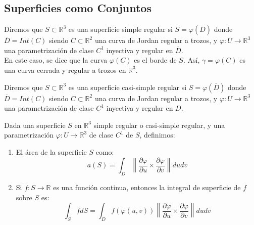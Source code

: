 \subsection{Superficies como Conjuntos}

\begin{definición} 
Diremos que $S \subset \mathbb{R}^3$ es una superficie simple regular si $S = \varphi (\overline{D})$ donde $\overline{D} = Int(C)$ siendo $C \subset \mathbb{R}^2$ una curva de Jordan regular a trozos, y $\varphi: U \to \mathbb{R}^3$ una parametrización de clase $C^1$ inyectiva y regular en $\overline{D}$.\\
En este caso, se dice que la curva $\varphi(C)$ es el borde de $S$. Así, $\gamma = \varphi(C)$ es una curva cerrada y regular a trozos en $\mathbb{R}^3$.
\end{definición}

\begin{definición} 
Diremos que $S \subset \mathbb{R}^3$ es una superficie casi-simple regular si $S = \varphi (\overline{D})$ donde $\overline{D} = Int(C)$ siendo $C \subset \mathbb{R}^2$ una curva de Jordan regular a trozos, y $\varphi: U \to \mathbb{R}^3$ una parametrización de clase $C^1$ inyectiva y regular en $D$.
\end{definición}

\begin{definición}
Dada una superficie $S$ en $\mathbb{R}^3$ simple regular o casi-simple regular, y una parametrización $\varphi: U \to \mathbb{R}^3$ de clase $C^1$ de $S$, definimos:
\vspace{-0.5em}
\begin{enumerate}
    \item El área de la superficie $S$ como: $$ a(S) = \int_{D} \left\lVert
              \frac{\partial \varphi}{\partial u} \times \frac{\partial \varphi}{\partial v}
              \right\rVert dudv $$
    \item  Si $f: S \to \mathbb{R}$ es una función continua, entonces la integral de
          superficie de $f$ sobre $S$ es: $$ \int_{S} f dS = \int_{D} f(\varphi(u,v))
              \left\lVert \frac{\partial \varphi}{\partial u} \times \frac{\partial
                  \varphi}{\partial v} \right\rVert dudv $$
\end{enumerate}
\end{definición}

